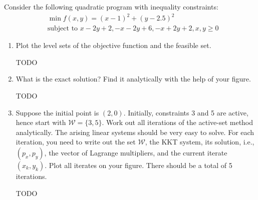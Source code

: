 \documentclass{../kin_math}
\begin{document}
\begin{questions}
  \question Consider the following quadratic program with inequality constraints:
  \begin{align*}
    &\min f(x, y) = (x - 1)^2 + (y - 2.5)^2 \\
    &\text{subject to } x - 2y + 2, -x - 2y + 6, -x + 2y + 2, x, y \geq 0
  \end{align*}
  \begin{enumerate}
    \item Plot the level sets of the objective function and the feasible set.
    \begin{solution}
      TODO
    \end{solution}
    \item What is the exact solution? Find it analytically with the help of your figure.
    \begin{solution}
      TODO
    \end{solution}
    \item Suppose the initial point is $(2, 0)$. Initially, constraints 3 and 5 are active, hence start with $\mathcal{W} = \{3, 5\}$. Work out all iterations of the active-set method analytically. The arising linear systems should be very easy to solve. For each iteration, you need to write out the set $\mathcal{W}$, the KKT system, its solution, i.e., $(p_x, p_y)$, the vector of Lagrange multipliers, and the current iterate $(x_k, y_k)$. Plot all iterates on your figure. There should be a total of 5 iterations.
    \begin{solution}
      TODO
    \end{solution}
  \end{enumerate}
\end{questions}
\end{document}
